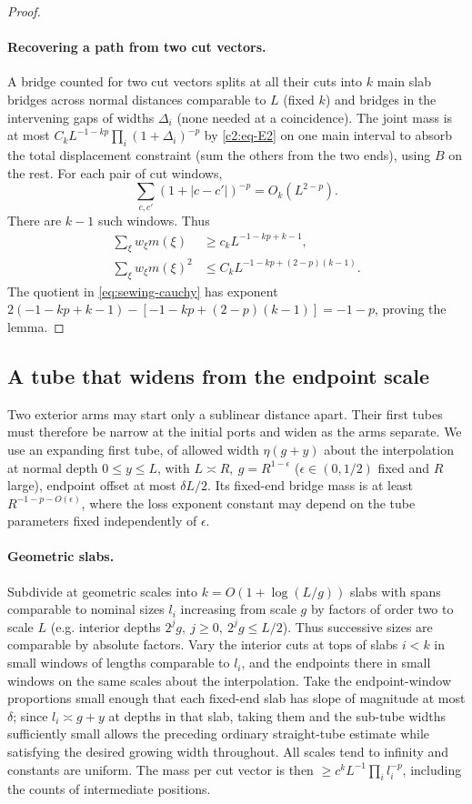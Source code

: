 \begin{proof}
\paragraph{Recovering a path from two cut vectors.}
A bridge counted for two cut vectors splits at all their cuts into \(k\) main slab bridges across normal distances comparable to \(L\) (fixed \(k\)) and bridges in the intervening gaps of widths \(\Delta_i\) (none needed at a coincidence). The joint mass is at most \(C_k L^{-1-kp}\prod_i(1+\Delta_i)^{-p}\) by \eqref{c2:eq-E2} on one main interval to absorb the total displacement constraint (sum the others from the two ends), using \(B\) on the rest. For each pair of cut windows,
\[
 \sum_{c,c'}(1+|c-c'|)^{-p}=O_k(L^{2-p}).
\]
There are \(k-1\) such windows. Thus
\[
\begin{aligned}
 \sum_\xi w_\xi m(\xi)&\ge c_k L^{-1-kp+k-1},\\
 \sum_\xi w_\xi m(\xi)^2&\le C_k L^{-1-kp+(2-p)(k-1)}.
\end{aligned}
\]
The quotient in \eqref{eq:sewing-cauchy} has exponent
\(2(-1-kp+k-1)-[-1-kp+(2-p)(k-1)]=-1-p\), proving the lemma.
\end{proof}

\subsection{A tube that widens from the endpoint scale}
Two exterior arms may start only a sublinear distance apart. Their first
tubes must therefore be narrow at the initial ports and widen as the arms
separate. We use an expanding first tube, of allowed width \(\eta(g+y)\) about the interpolation at normal depth \(0\le y\le L\), with \(L\asymp R,\ g=R^{1-\epsilon}\) (\(\epsilon\in(0,1/2)\) fixed and \(R\) large), endpoint offset at most \(\delta L/2\). Its fixed-end bridge mass is at least \(R^{-1-p-O(\epsilon)}\), where the loss exponent constant may depend on the tube parameters fixed independently of \(\epsilon\).

\paragraph{Geometric slabs.}
Subdivide at geometric scales into \(k=O(1+\log(L/g))\) slabs with spans comparable to nominal sizes \(l_i\) increasing from scale \(g\) by factors of order two to scale \(L\) (e.g. interior depths \(2^j g,\ j\ge0,\ 2^j g\le L/2\)). Thus successive sizes are comparable by absolute factors. Vary the interior cuts at tops of slabs \(i<k\) in small windows of lengths comparable to \(l_i\), and the endpoints there in small windows on the same scales about the interpolation. Take the endpoint-window proportions small enough that each fixed-end slab has slope of magnitude at most \(\delta\); since \(l_i\asymp g+y\) at depths in that slab, taking them and the sub-tube widths sufficiently small allows the preceding ordinary straight-tube estimate while satisfying the desired growing width throughout. All scales tend to infinity and constants are uniform. The mass per cut vector is then \(\ge c^k L^{-1}\prod_i l_i^{-p}\), including the counts of intermediate positions.

